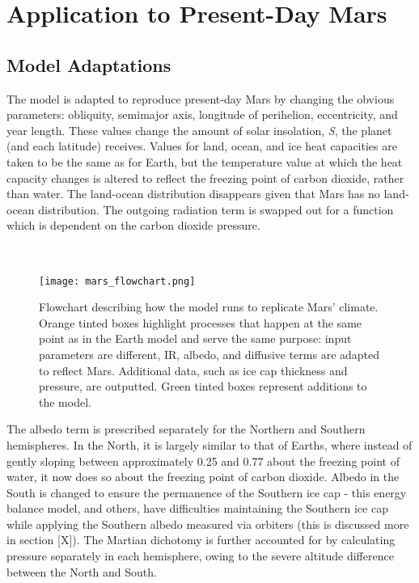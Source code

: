 \documentclass[12pt,onecolumn]{revtex4-2}    %
\begin{document}
\section{Application to Present-Day Mars}
\subsection{Model Adaptations}

The model is adapted to reproduce present-day Mars by changing the obvious parameters: obliquity, semimajor axis, longitude of perihelion, eccentricity, and year length. These values change the amount of solar insolation, \textit{S}, the planet (and each latitude) receives. Values for land, ocean, and ice heat capacities are taken to be the same as for Earth, but the temperature value at which the heat capacity changes is altered to reflect the freezing point of carbon dioxide, rather than water. The land-ocean distribution disappears given that Mars has no land-ocean distribution. The outgoing radiation term is swapped out for a function which is dependent on the carbon dioxide pressure. 

\

\begin{figure}[H]
\centering
\texttt{[image: mars\_flowchart.png]}
\caption{Flowchart describing how the model runs to replicate Mars' climate. Orange tinted boxes highlight processes that happen at the same point as in the Earth model and serve the same purpose: input parameters are different, IR, albedo, and diffusive terms are adapted to reflect Mars. Additional data, such as ice cap thickness and pressure, are outputted. Green tinted boxes represent additions to the model.}
\label{fig:test}
\end{figure}

The albedo term is prescribed separately for the Northern and Southern hemispheres. In the North, it is largely similar to that of Earths, where instead of gently sloping between approximately 0.25 and 0.77 about the freezing point of water, it now does so about the freezing point of carbon dioxide. Albedo in the South is changed to ensure the permanence of the Southern ice cap - this energy balance model, and others, have difficulties maintaining the Southern ice cap while applying the Southern albedo measured via orbiters (this is discussed more in section [X]). The Martian dichotomy is further accounted for by calculating pressure separately in each hemisphere, owing to the severe altitude difference between the North and South.
\end{document}
